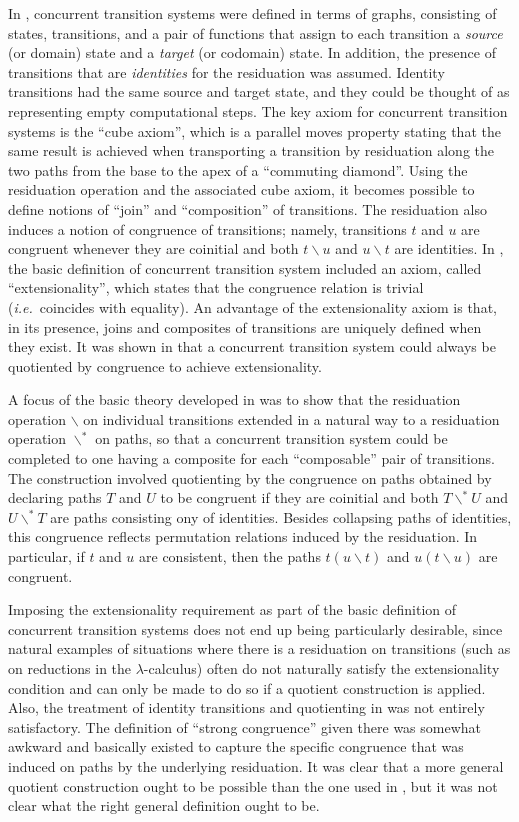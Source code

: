 \documentclass[11pt,notitlepage,a4paper]{report}
\newcommand\after{\backslash}
\begin{document}
In \cite{cts}, concurrent transition systems were defined in terms of graphs, consisting
of states, transitions, and a pair of functions that assign to each transition a {\em source}
(or domain) state and a {\em target} (or codomain) state.  In addition, the presence of
transitions that are {\em identities} for the residuation was assumed.
Identity transitions had the same source and target state, and they could be thought of as
representing empty computational steps.
The key axiom for concurrent transition systems is the ``cube axiom'', which
is a parallel moves property stating that the same result is achieved when transporting a
transition by residuation along the two paths from the base to the apex of a ``commuting diamond''.
Using the residuation operation and the associated cube axiom, it becomes possible to define
notions of ``join'' and ``composition'' of transitions.
The residuation also induces a notion of congruence of transitions; namely, transitions
$t$ and $u$ are congruent whenever they are coinitial and both $t \after u$ and $u \after t$
are identities.
In \cite{cts}, the basic definition of concurrent transition system included an axiom,
called ``extensionality'', which states that the congruence relation is trivial
({\em i.e.}~coincides with equality).  An advantage of the extensionality axiom is that,
in its presence, joins and composites of transitions are uniquely defined when they exist.
It was shown in \cite{cts} that a concurrent transition system could always be quotiented
by congruence to achieve extensionality.

A focus of the basic theory developed in \cite{cts} was to show that the residuation
operation $\after$ on individual transitions extended in a natural way to a residuation
operation $\after^\ast$ on paths, so that a concurrent transition system could be completed
to one having a composite for each ``composable'' pair of transitions.  The construction
involved quotienting by the congruence on paths obtained by declaring paths $T$ and $U$
to be congruent if they are coinitial and both $T \after^\ast U$ and $U \after^\ast T$
are paths consisting ony of identities.  Besides collapsing paths of identities, this
congruence reflects permutation relations induced by the residuation.  In particular,
if $t$ and $u$ are consistent, then the paths $t (u \after t)$ and $u (t \after u)$
are congruent.

Imposing the extensionality requirement as part of the basic definition of concurrent
transition systems does not end up being particularly desirable, since natural examples
of situations where there is a residuation on transitions (such as on reductions in
the $\lambda$-calculus) often do not naturally satisfy the extensionality condition
and can only be made to do so if a quotient construction is applied.
Also, the treatment of identity transitions and quotienting in \cite{cts} was not entirely
satisfactory.  The definition of ``strong congruence'' given there was somewhat awkward
and basically existed to capture the specific congruence that was induced on paths
by the underlying residuation.  It was clear that a more general quotient construction
ought to be possible than the one used in \cite{cts}, but it was not clear what the right
general definition ought to be.
\end{document}
